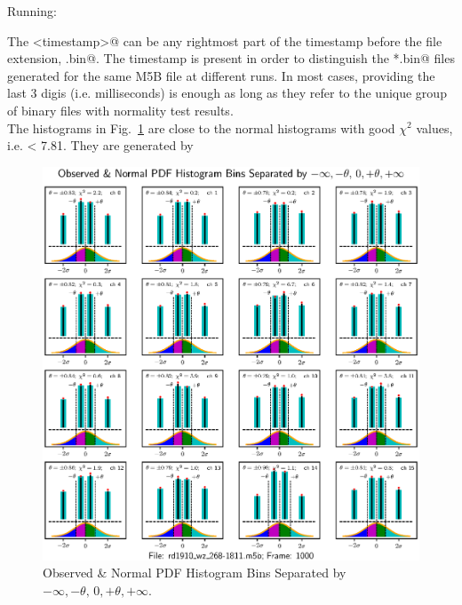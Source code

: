 \documentclass[letterpaper,twoside,12pt]{article}
\begin{document}
\noindent Running: \\

\noindent \verb@%run inspect_nt.py <m5b_filename> <timestamp> <start_frame_#> <#_of_frames> @ \\

The \verb@<timestamp>@ can be any rightmost part of the timestamp before the file extension, \verb@.bin@. The timestamp is present in order to distinguish the \verb@*.bin@ files generated for the same M5B file at different runs. In most cases, providing the last 3 digis (i.e. milliseconds) is enough as long as they refer to the unique group of binary files with normality test results. \\

The histograms in Fig.~\ref{hists_good_4x4} are close to the normal histograms with good $\chi^2$ values, i.e. < 7.81. They are generated by \\

\noindent \verb@%run inspect_nt.py rd1910_wz_268-1811.m5b 575 1000 1@. \\

\begin{figure}[ht!]
  \begin{center}
  \includegraphics[width=35pc]{fig_4x4_Histograms_good.eps}
  \caption{\small Observed \& Normal PDF Histogram Bins Separated by $-\infty, -\theta, \, 0, +\theta, +\infty$.}
  \label{hists_good_4x4}
  \end{center}
\end{figure}
\end{document}
